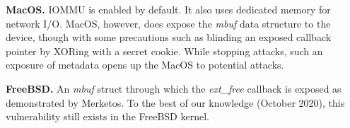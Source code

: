 \smallskip
\noindent\textbf{MacOS.} IOMMU is enabled by default. It also uses dedicated memory for network I/O. MacOS, however, does expose the \textit{mbuf} data structure to the device, though with some precautions such as blinding an exposed callback pointer by XORing with a secret cookie. While stopping \simple attacks, such an exposure of metadata opens up the MacOS to potential \compound attacks. 

\smallskip
\noindent\textbf{FreeBSD.} An \textit{mbuf} struct through which the \textit{ext\_free} callback is exposed as demonstrated by Merketos\cite{thunder}. To the best of our knowledge (October 2020), this vulnerability still exists in the FreeBSD kernel. 

